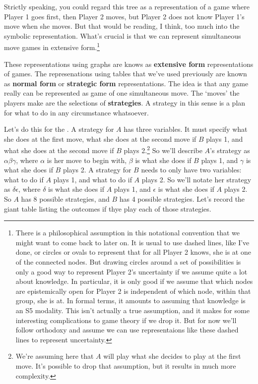 Strictly speaking, you could regard this tree as a representation of a game where Player 1 goes first, then Player 2 moves, but Player 2 does not know Player 1's move when she moves. But that would be reading, I think, too much into the symbolic representation. What's crucial is that we can represent simultaneous move games in extensive form.\footnote{There is a philosophical assumption in this notational convention that we might want to come back to later on. It is usual to use dashed lines, like I've done, or circles or ovals to represent that for all Player 2 knows, she is at one of the connected nodes. But drawing circles around a set of possibilities is only a good way to represent Player 2's uncertainty if we assume quite a lot about knowledge. In particular, it is only good if we assume that which nodes are epistemically open for Player 2 is independent of which node, within that group, she is at. In formal terms, it amounts to assuming that knowledge is an S5 modality. This isn't actually a true assumption, and it makes for some interesting complications to game theory if we drop it. But for now we'll follow orthodoxy and assume we can use representaions like these dashed lines to represent uncertainty.}

These representations using graphs are knows as \textbf{extensive form} representations of games. The represenations using tables that we've used previously are known as \textbf{normal form} or \textbf{strategic form} representations. The idea is that any game really can be represented as game of one simultaneous move. The `moves' the players make are the selections of \textbf{strategies}. A strategy in this sense is a plan for what to do in any circumstance whatsoever.

Let's do this for the . A strategy for $A$ has three variables. It must specify what she does at the first move, what she does at the second move if $B$ plays 1, and what she does at the second move if $B$ plays 2.\footnote{We're assuming here that $A$ will play what she decides to play at the first move. It's possible to drop that assumption, but it results in much more complexity.} So we'll describe $A$'s strategy as $\alpha \beta \gamma$, where $\alpha$ is her move to begin with, $\beta$ is what she does if $B$ plays 1, and $\gamma$ is what she does if $B$ plays 2.  A strategy for $B$ needs to only have two variables: what to do if $A$ plays 1, and what to do if $A$ plays 2. So we'll notate her strategy as $\delta \epsilon$, where $\delta$ is what she does if $A$ plays 1, and $\epsilon$ is what she does if $A$ plays 2. So $A$ has 8 possible strategies, and $B$ has 4 possible strategies. Let's record the giant table listing the outcomes if thye play each of those strategies.

